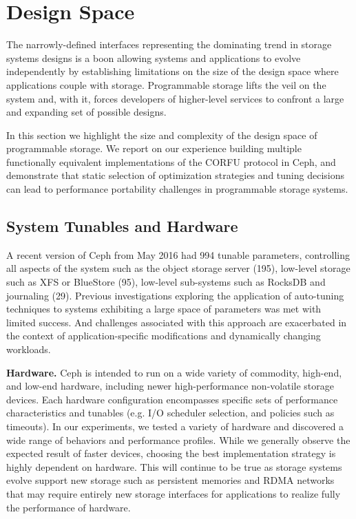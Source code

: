 \section{Design Space}
\label{sec:dspace}

The narrowly-defined interfaces representing the dominating trend in storage
systems designs is a boon allowing systems and applications to evolve
independently by establishing limitations on the size of the design space
where applications couple with storage. Programmable storage lifts the veil on
the system and, with it, forces developers of higher-level services to
confront a large and expanding set of possible designs.

In this section we highlight the size and complexity of the design space of
programmable storage. We report on our experience building multiple
functionally equivalent implementations of the CORFU protocol in Ceph, and
demonstrate that static selection of optimization strategies and tuning
decisions can lead to performance portability challenges in programmable
storage systems.

\subsection{System Tunables and Hardware}

A recent version of Ceph from May 2016 had 994 tunable parameters, controlling
all aspects of the system such as the object storage server (195), low-level
storage such as XFS or BlueStore (95), low-level sub-systems such as RocksDB
and journaling (29). Previous investigations exploring the application of
auto-tuning~\cite{behzad:sc2013-autotuning} techniques to systems exhibiting a
large space of parameters was met with limited success. And challenges
associated with this approach are exacerbated in the context of
application-specific modifications and dynamically changing workloads.

{\bf Hardware.} Ceph is intended to run on a wide variety of commodity,
high-end, and low-end hardware, including newer high-performance non-volatile
storage devices. Each hardware configuration encompasses specific sets of
performance characteristics and tunables (e.g. I/O scheduler selection, and
policies such as timeouts). In our experiments, we tested a variety of
hardware and discovered a wide range of behaviors and performance profiles.
While we generally observe the expected result of faster devices, choosing the
best implementation strategy is highly dependent on hardware. This will
continue to be true as storage systems evolve support new storage such as
persistent memories and RDMA networks that may require entirely new storage
interfaces for applications to realize fully the performance of hardware.

